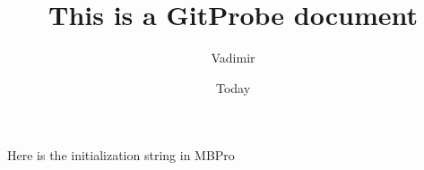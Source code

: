 \documentclass[]{article}
\begin{document}
\title{This is a GitProbe document}
\author{Vadimir}
\date{Today}
\maketitle

Here is the initialization string in MBPro
\end{document}
